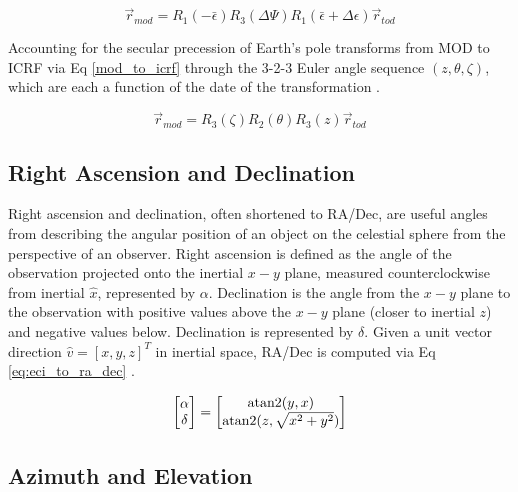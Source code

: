 \begin{equation} \label{eq:tod_to_mod}
  \vec{r}_{mod} = R_1(-\bar{\epsilon}) R_3(\Delta\Psi) R_1(\bar{\epsilon} + \Delta\epsilon) \vec{r}_{tod}
\end{equation}

Accounting for the secular precession of Earth's pole transforms from MOD to ICRF via Eq \ref{mod_to_icrf} through the 3-2-3 Euler angle sequence $\left( z, \theta, \zeta \right)$, which are each a function of the date of the transformation \cite{frueh2019notes}.

\begin{equation} \label{eq:tod_to_mod}
  \vec{r}_{mod} = R_3(\zeta) R_2(\theta) R_3(z) \vec{r}_{tod}
\end{equation}

\subsection{Right Ascension and Declination}

Right ascension and declination, often shortened to RA/Dec, are useful angles from describing the angular position of an object
on the celestial sphere from the perspective of an observer. Right ascension is defined as the angle
of the observation projected onto the inertial $x-y$ plane, measured counterclockwise from inertial
$\hat{x}$, represented by $\alpha$. Declination is the angle from the $x-y$ plane to the observation
with positive values above the $x-y$ plane (closer to inertial $z$) and negative values below.
Declination is represented by $\delta$. Given a unit vector direction $\hat{v} = \left[ x, y, z \right]^T$ in
inertial space, RA/Dec is computed via Eq \ref{eq:eci_to_ra_dec} \cite{frueh2019notes}.

\begin{equation} \label{eq:eci_to_ra_dec}
  \begin{bmatrix}
	\alpha \\
	\delta
  \end{bmatrix} = 
  \begin{bmatrix}
	\operatorname{atan2}(y, x) \\
	\operatorname{atan2}(z, \sqrt{x^2 + y^2})
  \end{bmatrix}
\end{equation}

\subsection{Azimuth and Elevation}


